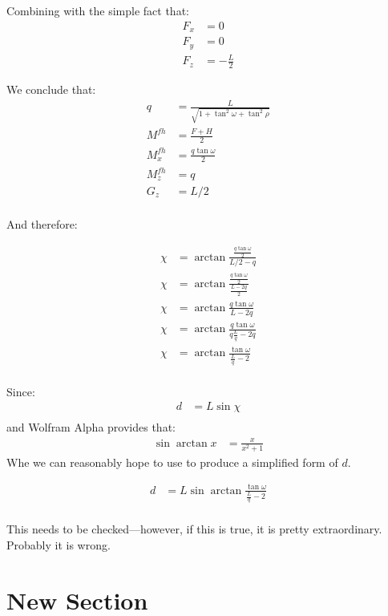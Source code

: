 \documentclass[11pt]{article}
\begin{document}
Combining with the simple fact that:
\begin{align}
  F_x &= 0 \\
  F_y &= 0  \\
  F_z &= - \frac{L}{2}
\end{align}

We conclude that:
\begin{align}
  q &= \frac{L}{\sqrt{1 + \tan^2{\omega} + \tan^2{\rho}}}  \\  
  M^{fh} &= \frac{F + H}{2} \\
  M^{fh}_x &= \frac{q \tan{\omega}}{2} \\
  M^{fh}_z &= q \\
  G_z &= L/2 \\
\end{align}

And therefore:

\begin{align}
  \chi &= \arctan{\frac{\frac{q \tan{\omega}}{2}}{L/2 - q}} \\
  \chi &= \arctan{\frac{\frac{q \tan{\omega}}{2}}{\frac{L - 2q}{2}}} \\
  \chi &= \arctan{\frac{q \tan{\omega}}{L - 2q}} \\
  \chi &= \arctan{\frac{q \tan{\omega}}{q\frac{L}{q} - 2q}} \\
  \chi &= \arctan{\frac{ \tan{\omega}}{\frac{L}{q} - 2}} \\
\end{align}

Since:
\begin{align}
  d &= L \sin{\chi} \\
\end{align}
and Wolfram Alpha provides that:
\begin{align}
  \sin{\arctan{x}} &= \frac{x}{x^2 + 1}
\end{align}
Whe we can reasonably hope to use to produce a simplified form of
$d$.

\begin{align}
  d  &= L \sin{\arctan{\frac{ \tan{\omega}}{\frac{L}{q} - 2}}} \\  
\end{align}

This needs to be checked---however, if this is true, it is pretty
extraordinary. Probably it is wrong.

\section{New Section}
\end{document}
